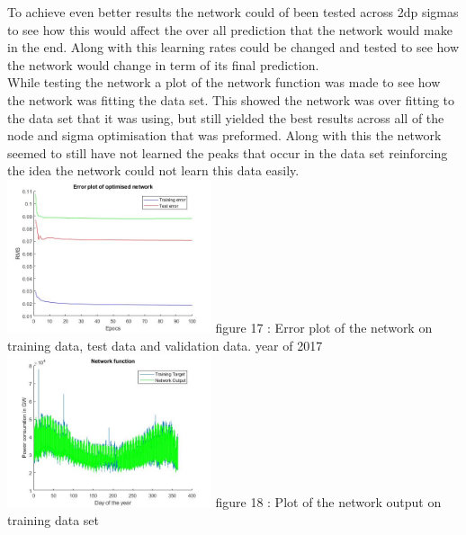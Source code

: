 \documentclass{IEEEtran}[11pt]
\begin{document}
\begin{flushleft}
  To achieve even better results the network could of been tested across 2dp sigmas
  to see how this would affect the over all prediction that the network would
  make in the end. Along with this learning rates could be changed and tested to
  see how the network would change in term of its final prediction.
  \\
  \vspace{1.5mm}
  While testing the network a plot of the network function was made to see how
  the network was fitting the data set. This showed the network was over fitting
  to the data set that it was using, but still yielded the best results across
  all of the node and sigma optimisation that was preformed. Along with this the
  network seemed to still have not learned the peaks that occur in the data set
  reinforcing the idea the network could not learn this data easily.
  \\
  \space{1.5mm}
  \includegraphics[width = 0.45\textwidth]{errorPrediction.jpg}
  \vspace{1.5mm}
  {\footnotesize figure 17 : Error plot of the network on training data, test data
  and validation data.
  year of 2017 }
  \\
  \vspace{1.5mm}
  \includegraphics[width = 0.45\textwidth]{predictiontrainingdata.jpg}
  \vspace{1.5mm}
  {\footnotesize figure 18 : Plot of the network output on training data set }
  \\
\end{flushleft}
\end{document}
